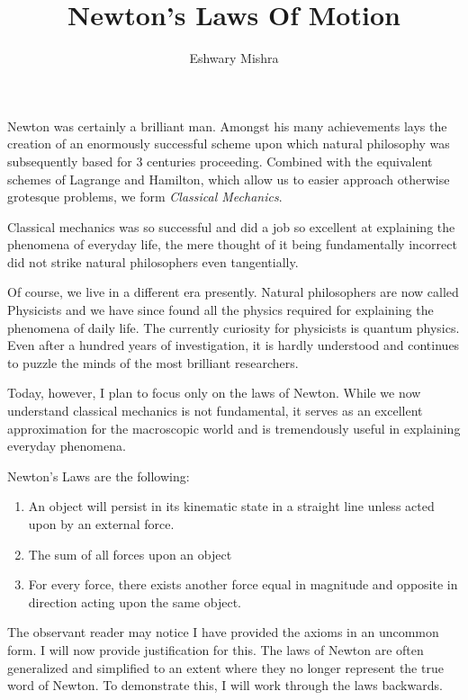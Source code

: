 \documentclass[12pt, letterpaper, openany]{article}
\title{Newton's Laws Of Motion}
\author{Eshwary Mishra}
\date{}
\begin{document}
\maketitle

Newton was certainly a brilliant man. Amongst his many achievements lays the creation of an enormously successful scheme upon which natural philosophy was subsequently based for 3 centuries proceeding. Combined with the equivalent schemes of Lagrange and Hamilton, which allow us to easier approach otherwise grotesque problems, we form \emph{Classical Mechanics}.

Classical mechanics was so successful and did a job so excellent at explaining the phenomena of everyday life, the mere thought of it being fundamentally incorrect did not strike natural philosophers even tangentially.

Of course, we live in a different era presently. Natural philosophers are now called Physicists and we have since found all the physics required for explaining the phenomena of daily life. The currently curiosity for physicists is quantum physics. Even after a hundred years of investigation, it is hardly understood and continues to puzzle the minds of the most brilliant researchers.

Today, however, I plan to focus only on the laws of Newton. While we now understand classical mechanics is not fundamental, it serves as an excellent approximation for the macroscopic world and is tremendously useful in explaining everyday phenomena.

Newton's Laws are the following:
\begin{enumerate}
\item An object will persist in its kinematic state in a straight line unless acted upon by an external force.

\item The sum of all forces upon an object

\item For every force, there exists another force equal in magnitude and opposite in direction acting upon the same object.
\end{enumerate}

The observant reader may notice I have provided the axioms in an uncommon form. I will now provide justification for this. The laws of Newton are often generalized and simplified to an extent where they no longer represent the true word of Newton. To demonstrate this, I will work through the laws backwards.
\end{document}
